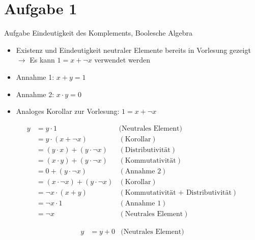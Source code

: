 
\section{Aufgabe 1}

\setcounter{exercise}{1}

\begin{frame}[allowframebreaks]{Aufgabe \thesection}{Eindeutigkeit des Komplements, Boolesche Algebra}
  \begin{solutionnoinc}
    \begin{itemize}
      \item Existenz und Eindeutigkeit neutraler Elemente bereits in Vorlesung gezeigt $\rightarrow$ Es kann $1 = x + \neg x$ verwendet werden
      \item \alert{Annahme 1:} $x + y = 1$
      \item \alert{Annahme 2:} $x \cdot y = 0$
      \item \alert{Analoges Korollar zur Vorlesung:} $1 = x + \neg x$
    \end{itemize}
  \end{solutionnoinc}
  \begin{solutionnoinc}
    \tiny
    \begin{align*}
      y&=y\cdot1&{({\text{Neutrales~Element)}}}\\
      &{=y\cdot(x+\neg x)}&{(\text{Korollar})}\\
      &{=(y\cdot x)+(y\cdot \neg x)}&{(\text{Distributivität})}\\
      &{=(x\cdot y)+(y\cdot \neg x)}&{(\text{Kommutativität})}\\
      &{=0+(y\cdot \neg x)}&{(\text{Annahme 2})}\\
      &{=(x\cdot\neg x)+(y\cdot\neg x)}&{(\text{Korollar})}\\
      &{=\neg x\cdot (x+ y)}&{(\text{Kommutativität + Distributivität})}\\
      &{=\neg x\cdot 1}&{(\text{Annahme 1})}\\
      &=\neg x &(\text{Neutrales~Element})
    \end{align*}
  \end{solutionnoinc}
  \begin{solutionnoinc}
    \tiny
    \begin{align*}
      y  &= y + 0 & \text{(Neutrales Element)}\\ 

\end{align*}
\end{solutionnoinc}
\end{frame}
